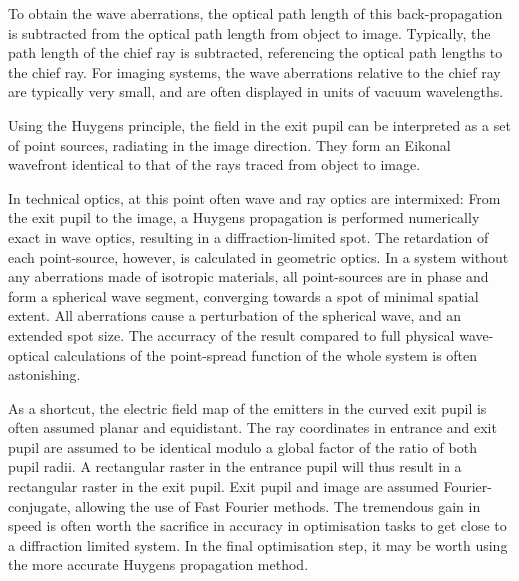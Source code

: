 \documentclass[12pt,a4paper,twoside,openright,BCOR10mm,headsepline,titlepage,abstracton,chapterprefix,final]{scrreprt}
\begin{document}
To obtain the wave aberrations, the optical path length of this back-propagation is subtracted from the optical path length from object to image.
Typically, the path length of the chief ray is subtracted, referencing the optical path lengths to the chief ray. 
For imaging systems, the wave aberrations relative to the chief ray are typically very small, and are often displayed in units of vacuum wavelengths.

Using the Huygens principle, the field in the exit pupil can be interpreted as a set of point sources, radiating in the image direction. 
They form an Eikonal wavefront identical to that of the rays traced from object to image.

In technical optics, at this point often wave and ray optics are intermixed:
From the exit pupil to the image, a Huygens propagation is performed numerically exact in wave optics, resulting in a diffraction-limited spot. 
The retardation of each point-source, however, is calculated in geometric optics.
In a system without any aberrations made of isotropic materials, all point-sources are in phase and form a spherical wave segment, converging towards a spot of minimal spatial extent.
All aberrations cause a perturbation of the spherical wave, and an extended spot size.
The accurracy of the result compared to full physical wave-optical calculations of the point-spread function of the whole system is often astonishing. 

As a shortcut, the electric field map of the emitters in the curved exit pupil is often assumed planar and equidistant. 
The ray coordinates in entrance and exit pupil are assumed to be identical modulo a global factor of the ratio of both pupil radii.
A rectangular raster in the entrance pupil will thus result in a rectangular raster in the exit pupil.
Exit pupil and image are assumed Fourier-conjugate, allowing the use of Fast Fourier methods.
The tremendous gain in speed is often worth the sacrifice in accuracy in optimisation tasks to get close to a diffraction limited system.
In the final optimisation step, it may be worth using the more accurate Huygens propagation method.
\end{document}
